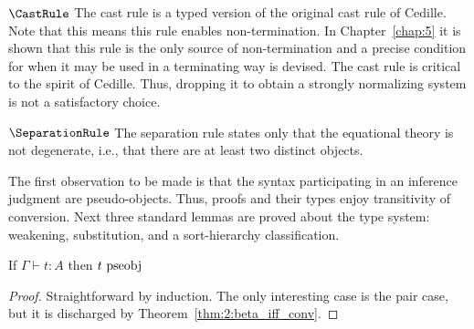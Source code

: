 $\CastRule$ The cast rule is a typed version of the original cast rule of Cedille.
Note that this means this rule enables non-termination.
In Chapter~\ref{chap:5} it is shown that this rule is the only source of non-termination and a precise condition for when it may be used in a terminating way is devised.
The cast rule is critical to the spirit of Cedille.
Thus, dropping it to obtain a strongly normalizing system is not a satisfactory choice.

$\SeparationRule$ The separation rule states only that the equational theory is not degenerate, i.e., that there are at least two distinct objects.



The first observation to be made is that the syntax participating in an inference judgment are pseudo-objects.
Thus, proofs and their types enjoy transitivity of conversion.
Next three standard lemmas are proved about the type system: weakening, substitution, and a sort-hierarchy classification.

\begin{lemma}
    If $\Gamma \vdash t : A$ then $t~\textnormal{pseobj}$
    \label{lem:2:infer_implies_pseobj}
\end{lemma}
\begin{proof}
    Straightforward by induction.
    The only interesting case is the pair case, but it is discharged by Theorem~\ref{thm:2:beta_iff_conv}.
\end{proof}

